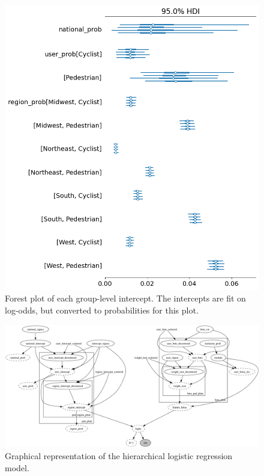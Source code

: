 \documentclass[12pt]{article}
\begin{document}
\begin{figure}[h]
    \centering
    \includegraphics[width=\textwidth]{images/prob_intercepts.png}
    \caption{Forest plot of each group-level intercept. The intercepts are fit on log-odds,
        but converted to probabilities for this plot.}
    \label{fig:prob_intercepts}
\end{figure}


    \begin{figure}[h]
        \centering
        \includegraphics[width=\textwidth]{images/model_graph.png}
        \caption{Graphical representation of the hierarchical logistic regression model.}
        \label{fig:model_graph}
    \end{figure}
\end{document}
